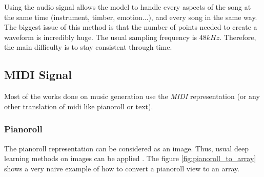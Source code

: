 \documentclass[12pt]{report}
\begin{document}
Using the audio signal allows the model to handle every aspects of the song at the same time (instrument, timber, emotion...), and every song in the same way.
The biggest issue of this method is that the number of points needed to create a waveform is incredibly huge.
The usual sampling frequency is $48kHz$. 
Therefore, the main difficulty is to stay consistent through time.

\subsection{MIDI Signal}

Most of the works done on music generation use the \textit{MIDI} representation (or any other translation of midi like pianoroll or text). \cite{chuan_modeling_nodate, hadjeres_deepbach:_2016, huang_counterpoint_2017, liang_automatic_2017, adiloglu_machine_2007, herremans_composing_2013, herremans_modeling_2017, boulanger-lewandowski_modeling_2012, lattner_imposing_2018, colombo_learning_2019, brunner_symbolic_2018, wu_hierarchical_2018}

\subsubsection{Pianoroll}

The pianoroll representation can be considered as an image.
Thus, usual deep learning methods on images can  be applied \cite{huang_counterpoint_2017, chuan_modeling_nodate, boulanger-lewandowski_modeling_2012, lattner_imposing_2018, donahue_adversarial_2019}.
The figure \ref{fig:pianoroll_to_array} shows a very naive example of how to convert a pianoroll view to an array.
\end{document}
